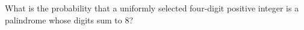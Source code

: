 What is the probability that a uniformly selected four-digit positive integer is a palindrome whose digits sum to $8$?
